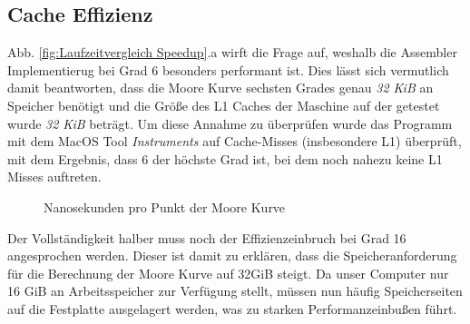 \documentclass[course=erap]{aspdoc}
\begin{document}
\subsection{Cache Effizienz}
Abb. \ref{fig:Laufzeitvergleich Speedup}.a wirft die Frage auf, weshalb die Assembler Implementierug bei Grad 6 besonders performant ist. Dies lässt sich vermutlich damit beantworten, dass die Moore Kurve sechsten Grades genau \textit{32 KiB} an Speicher benötigt und die Größe des L1 Caches der Maschine auf der getestet wurde \textit{32 KiB} beträgt. Um diese Annahme zu überprüfen wurde das Programm mit dem MacOS Tool \textit{Instruments} auf Cache-Misses (insbesondere L1) überprüft, mit dem Ergebnis, dass 6 der höchste Grad ist, bei dem noch nahezu keine L1 Misses auftreten.

\begin{figure}[h] 
    \centering
    \qquad
    \caption{Nanosekunden pro Punkt der Moore Kurve}%
    \label{fig:Laufzeitvergleich Skaliert}%
 \end{figure}
 
 Der Vollständigkeit halber muss noch der Effizienzeinbruch bei Grad 16 angesprochen werden. Dieser ist damit zu erklären, dass die Speicheranforderung für die Berechnung der Moore Kurve auf 32GiB steigt. Da unser Computer nur 16 GiB an Arbeitsspeicher zur Verfügung stellt, müssen nun häufig Speicherseiten auf die Festplatte ausgelagert werden, was zu starken Performanzeinbußen führt.


\FloatBarrier
\end{document}
